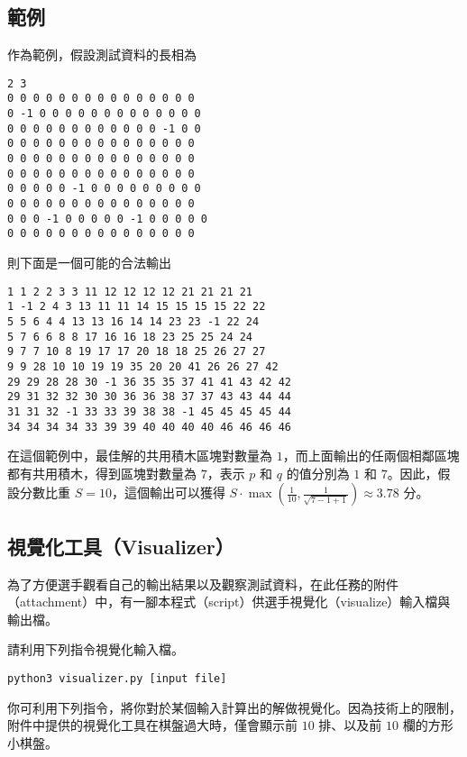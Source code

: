 \newpage

\subsection{範例}

作為範例，假設測試資料的長相為

\begin{verbatim}
2 3
0 0 0 0 0 0 0 0 0 0 0 0 0 0 0
0 -1 0 0 0 0 0 0 0 0 0 0 0 0 0
0 0 0 0 0 0 0 0 0 0 0 0 -1 0 0
0 0 0 0 0 0 0 0 0 0 0 0 0 0 0
0 0 0 0 0 0 0 0 0 0 0 0 0 0 0
0 0 0 0 0 0 0 0 0 0 0 0 0 0 0
0 0 0 0 0 -1 0 0 0 0 0 0 0 0 0
0 0 0 0 0 0 0 0 0 0 0 0 0 0 0
0 0 0 -1 0 0 0 0 0 -1 0 0 0 0 0
0 0 0 0 0 0 0 0 0 0 0 0 0 0 0
\end{verbatim}

則下面是一個可能的合法輸出

\begin{verbatim}
1 1 2 2 3 3 11 12 12 12 12 21 21 21 21
1 -1 2 4 3 13 11 11 14 15 15 15 15 22 22
5 5 6 4 4 13 13 16 14 14 23 23 -1 22 24
5 7 6 6 8 8 17 16 16 18 23 25 25 24 24
9 7 7 10 8 19 17 17 20 18 18 25 26 27 27
9 9 28 10 10 19 19 35 20 20 41 26 26 27 42
29 29 28 28 30 -1 36 35 35 37 41 41 43 42 42
29 31 32 32 30 30 36 36 38 37 37 43 43 44 44
31 31 32 -1 33 33 39 38 38 -1 45 45 45 45 44
34 34 34 34 33 39 39 40 40 40 40 46 46 46 46
\end{verbatim}

在這個範例中，最佳解的共用積木區塊對數量為
\(1\)，而上面輸出的任兩個相鄰區塊都有共用積木，得到區塊對數量為
\(7\)，表示 \(p\) 和 \(q\) 的值分別為 \(1\) 和 \(7\)。因此，假設分數比重
\(S=10\)，這個輸出可以獲得
\(S\cdot\max\left(\frac{1}{10}, \frac{1}{\sqrt{7 - 1 + 1}}\right) \approx 3.78\)
分。

\subsection{視覺化工具（Visualizer）}

為了方便選手觀看自己的輸出結果以及觀察測試資料，在此任務的附件（attachment）中，有一腳本程式（script）供選手視覺化（visualize）輸入檔與輸出檔。

請利用下列指令視覺化輸入檔。

\begin{verbatim}
python3 visualizer.py [input file]
\end{verbatim}

你可利用下列指令，將你對於某個輸入計算出的解做視覺化。因為技術上的限制，附件中提供的視覺化工具在棋盤過大時，僅會顯示前
\(10\) 排、以及前 \(10\) 欄的方形小棋盤。

